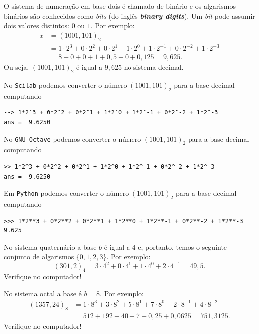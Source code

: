 \begin{ex} O sistema de numeração em base dois é chamado de binário e os algarismos binários são conhecidos como \textit{bits} (do inglês \textit{\bf{b}inary dig\bf{its}}). Um \textit{bit} pode assumir dois valores distintos: $0$ ou $1$. Por exemplo:
\begin{equation*}
  \begin{split}
    x &= (1001,101)_{2} \\
    &= 1\cdot 2^3 +0\cdot 2^2 +0\cdot 2^1 +1\cdot 2^0  +1\cdot 2^{-1} +0\cdot 2^{-2} +1\cdot 2^{-3} \\
    &= 8+0+0+1+ 0,5+0+0,125 = 9,625.
  \end{split}
\end{equation*}
Ou seja, $(1001,101)_{2}$ é igual a $9,625$ no sistema decimal.

\ifisscilab
No \verb+Scilab+ podemos converter o número $(1001,101)_2$ para a base decimal computando
\begin{verbatim}
--> 1*2^3 + 0*2^2 + 0*2^1 + 1*2^0 + 1*2^-1 + 0*2^-2 + 1*2^-3
ans =  9.6250
\end{verbatim}
\fi
\ifisoctave
No \verb+GNU Octave+ podemos converter o número $(1001,101)_2$ para a base decimal computando
\begin{verbatim}
>> 1*2^3 + 0*2^2 + 0*2^1 + 1*2^0 + 1*2^-1 + 0*2^-2 + 1*2^-3
ans =  9.6250
\end{verbatim}
\fi
\ifispython
Em \verb+Python+ podemos converter o número $(1001,101)_2$ para a base decimal computando
\begin{verbatim}
>>> 1*2**3 + 0*2**2 + 0*2**1 + 1*2**0 + 1*2**-1 + 0*2**-2 + 1*2**-3
9.625
\end{verbatim}
\fi
\end{ex}


\begin{ex}
No sistema quaternário a base $b$ é igual a $4$ e, portanto, temos o seguinte conjunto de algarismos $\{0, 1, 2, 3\}$. Por exemplo:
  \begin{equation*}
    (301,2)_{4}=3\cdot 4^2+0\cdot 4^1+1\cdot 4^0+2\cdot 4^{-1}=49,5.
  \end{equation*}
Verifique no computador!
\end{ex}

\begin{ex}
No sistema octal a base é $b=8$. Por exemplo:
\begin{equation*}
  \begin{split}
    (1357,24)_{8}&= 1\cdot 8^3+3\cdot 8^2+5\cdot 8^1+7\cdot 8^{0}+2\cdot 8^{-1}+4\cdot 8^{-2}\\
    &= 512+192+40+7+0,25+0,0625=751,3125.
  \end{split}
\end{equation*}
Verifique no computador!
\end{ex}

